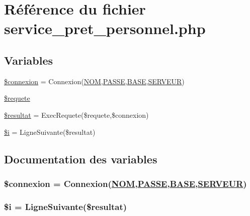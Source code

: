\hypertarget{service__pret__personnel_8php}{
\section{R\'{e}f\'{e}rence du fichier service\_\-pret\_\-personnel.php}
\label{service__pret__personnel_8php}
}
\subsection*{Variables}
\begin{CompactItemize}
\item 
\hyperlink{service__pret__personnel_8php_a0}{\$connexion} = Connexion(\hyperlink{pma__connect_8php_a0}{NOM},\hyperlink{pma__connect_8php_a1}{PASSE},\hyperlink{pma__connect_8php_a3}{BASE},\hyperlink{pma__connect_8php_a2}{SERVEUR})
\item 
\hyperlink{service__pret__personnel_8php_a1}{\$requete}
\item 
\hyperlink{service__pret__personnel_8php_a2}{\$resultat} = Exec\-Requete(\$requete,\$connexion)
\item 
\hyperlink{service__pret__personnel_8php_a3}{\$i} = Ligne\-Suivante(\$resultat)
\end{CompactItemize}


\subsection{Documentation des variables}
\hypertarget{service__pret__personnel_8php_a0}{
\subsubsection[\$connexion]{\setlength{\rightskip}{0pt plus 5cm}\$connexion = Connexion(\hyperlink{pma__connect_8php_a0}{NOM},\hyperlink{pma__connect_8php_a1}{PASSE},\hyperlink{pma__connect_8php_a3}{BASE},\hyperlink{pma__connect_8php_a2}{SERVEUR})}}
\label{service__pret__personnel_8php_a0}


\hypertarget{service__pret__personnel_8php_a3}{
\subsubsection[\$i]{\setlength{\rightskip}{0pt plus 5cm}\$i = Ligne\-Suivante(\$resultat)}}
\label{service__pret__personnel_8php_a3}


